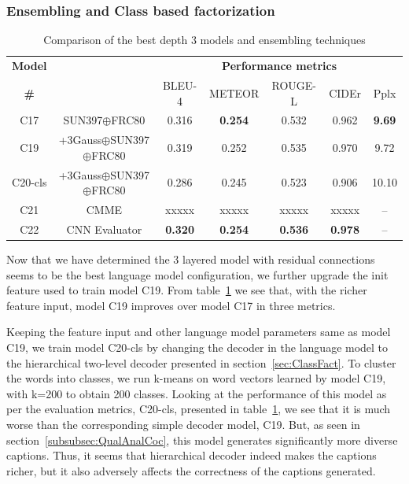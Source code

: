 \subsubsection{Ensembling and Class based factorization}
\begin{table}[htp]
  \centering
  \newcommand{\bs}{\small}
  \begin{adjustbox}{center}
  \begin{tabular}{|c|c|c|c|c|c|c|}
    \hline
    \bf Model & \bf \multirow{2}{*}{Init Feature} & \multicolumn{5}{c|}{\bf Performance metrics}\\
    \cline{3-7}
    \bf \# &\bf &\bs BLEU-4 &\bs METEOR &\bs ROUGE-L &\bs CIDEr&\bs Pplx \\\hline
    C17 & SUN397$\oplus$FRC80& 0.316 &\bf0.254&0.532 & 0.962   &\bf9.69 \\
    C19 &\parbox[c][][c]{4cm}{\smallskip{}+3Gauss$\oplus$SUN397\\$\oplus$FRC80\smallskip} 
                             & 0.319 & 0.252 & 0.535 & 0.970 & 9.72 \\\hline
    C20-cls &\parbox[c][][c]{4cm}{\smallskip{}+3Gauss$\oplus$SUN397\\$\oplus$FRC80\smallskip} 
                             & 0.286 & 0.245 & 0.523 & 0.906 & 10.10 \\\hline
    C21& CMME                & xxxxx & xxxxx & xxxxx & xxxxx & -- \\
    C22& CNN Evaluator       &\bf0.320&\bf0.254 &\bf0.536 &\bf0.978 & -- \\\hline
  \end{tabular}
  \end{adjustbox}
  \caption{Comparison of the best depth 3 models and ensembling techniques}
  \label{tab:resfinalCocValset}
\end{table}

Now that we have determined the 3 layered model with residual connections seems to
be the best language model configuration, we further upgrade the init feature
used to train model C19.
From table~\ref{tab:resfinalCocValset} we see that, with the richer feature
input, model C19 improves over model C17 in three metrics. 

Keeping the feature input and other language model parameters same as model C19,
we train model C20-cls by changing the decoder in the language model to the
hierarchical two-level decoder presented in section~\ref{sec:ClassFact}.
To cluster the words into classes, we run k-means on word vectors learned by
model C19, with k=200 to obtain 200 classes. 
Looking at the performance of this model as per the evaluation metrics, C20-cls,
presented in table~\ref{tab:resfinalCocValset}, we see that it is much worse
than the corresponding simple decoder model, C19.
But, as seen in section~\ref{subsubsec:QualAnalCoc}, this model generates 
significantly more diverse captions.
Thus, it seems that hierarchical decoder indeed makes the captions richer, but
it also adversely affects the correctness of the captions generated.

